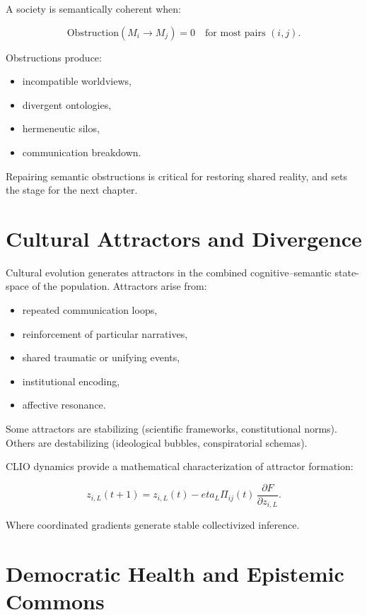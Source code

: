 \documentclass[12pt,oneside]{book}
\theoremstyle{plain}
\theoremstyle{definition}
\def\eta{eta}%
\begin{document}
A society is semantically coherent when:

\[
\mathrm{Obstruction}(M_i \to M_j) = 0
\quad
\text{for most pairs } (i,j).
\]

Obstructions produce:

\begin{itemize}
    \item incompatible worldviews,
    \item divergent ontologies,
    \item hermeneutic silos,
    \item communication breakdown.
\end{itemize}

Repairing semantic obstructions is critical for restoring shared reality, and 
sets the stage for the next chapter.

\section{Cultural Attractors and Divergence}

Cultural evolution generates attractors in the combined cognitive–semantic 
state-space of the population.  
Attractors arise from:

\begin{itemize}
    \item repeated communication loops,
    \item reinforcement of particular narratives,
    \item shared traumatic or unifying events,
    \item institutional encoding,
    \item affective resonance.
\end{itemize}

Some attractors are stabilizing (scientific frameworks, constitutional norms).  
Others are destabilizing (ideological bubbles, conspiratorial schemas).

CLIO dynamics provide a mathematical characterization of attractor formation:

\[
z_{i,L}(t+1)
=
z_{i,L}(t)
-
\eta_L \Pi_{ij}(t)\,
\frac{\partial F}{\partial z_{i,L}}.
\]

Where coordinated gradients generate stable collectivized inference.

\section{Democratic Health and Epistemic Commons}
\end{document}
